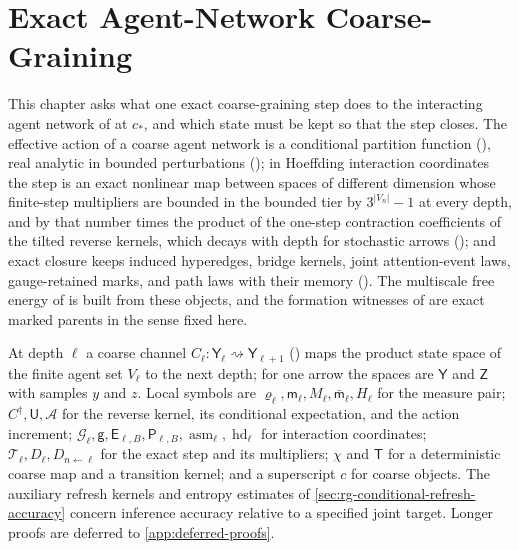 \chapter{Exact Agent-Network Coarse-Graining}
\label{ch:agent-network-rg}

This chapter asks what one exact coarse-graining step does to the interacting
agent network of  at $c_*$, and which state must
be kept so that the step closes. The effective action of a coarse agent network
is a conditional partition function (), real
analytic in bounded perturbations (); in
Hoeffding interaction coordinates the step is an exact nonlinear map between
spaces of different dimension whose finite-step multipliers are bounded in the bounded tier by
$3^{\lvert V_n\rvert}-1$ at every depth, and by that number times the product of the
one-step contraction coefficients of the tilted reverse kernels, which decays with depth for
stochastic arrows (); and exact closure keeps induced
hyperedges, bridge kernels, joint attention-event laws, gauge-retained marks, and
path laws with their memory (). The multiscale free
energy of  is built from these objects, and the
formation witnesses of  are exact marked parents
in the sense fixed here.

At depth $\ell$ a coarse channel $C_\ell:\mathsf Y_\ell\rightsquigarrow\mathsf
Y_{\ell+1}$ () maps the product state space of the
finite agent set $V_\ell$ to the next depth; for one arrow the spaces are
$\mathsf Y$ and $\mathsf Z$ with samples $y$ and $z$. Local symbols are
$\varrho_\ell,\mathsf m_\ell,M_\ell,\bar{\mathsf m}_\ell,H_\ell$ for the measure pair;
$C^\dagger,\mathsf U,\mathcal A$ for the reverse kernel, its conditional
expectation, and the action increment; $\mathcal G_\ell,\mathsf g,\mathsf
E_{\ell,B},\mathsf P_{\ell,B},\operatorname{asm}_\ell,\operatorname{hd}_\ell$ for
interaction coordinates; $\mathcal T_\ell,D_\ell,D_{n\leftarrow\ell}$ for the exact
step and its multipliers; $\chi$ and $\mathsf T$ for a deterministic coarse map and
a transition kernel; and a superscript $c$ for coarse objects. The auxiliary
refresh kernels and entropy estimates of
\cref{sec:rg-conditional-refresh-accuracy} concern inference accuracy
relative to a specified joint target. Longer proofs are
deferred to \cref{app:deferred-proofs}.

